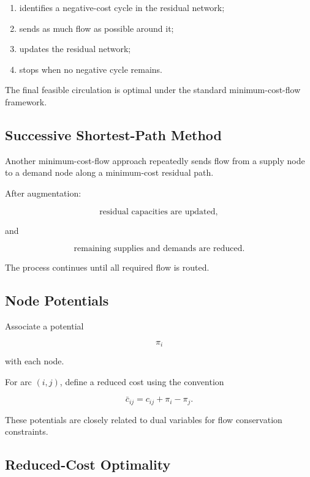\begin{enumerate}
    \item identifies a negative-cost cycle in the residual network;
    \item sends as much flow as possible around it;
    \item updates the residual network;
    \item stops when no negative cycle remains.
\end{enumerate}

The final feasible circulation is optimal under the standard
minimum-cost-flow framework.

\subsection{Successive Shortest-Path Method}
\label{subsec:successive-shortest-path}

Another minimum-cost-flow approach repeatedly sends flow from a supply node
to a demand node along a minimum-cost residual path.

After augmentation:

\[
\boxed{
\text{residual capacities are updated},
}
\]

and

\[
\boxed{
\text{remaining supplies and demands are reduced}.
}
\]

The process continues until all required flow is routed.

\subsection{Node Potentials}
\label{subsec:node-potentials}

Associate a potential

\[
\pi_i
\]

with each node.

For arc \((i,j)\), define a reduced cost using the convention

\[
\boxed{
\bar{c}_{ij}
=
c_{ij}
+
\pi_i
-
\pi_j.
}
\]

These potentials are closely related to dual variables for flow
conservation constraints.

\subsection{Reduced-Cost Optimality}
\label{subsec:network-reduced-cost-optimality}

